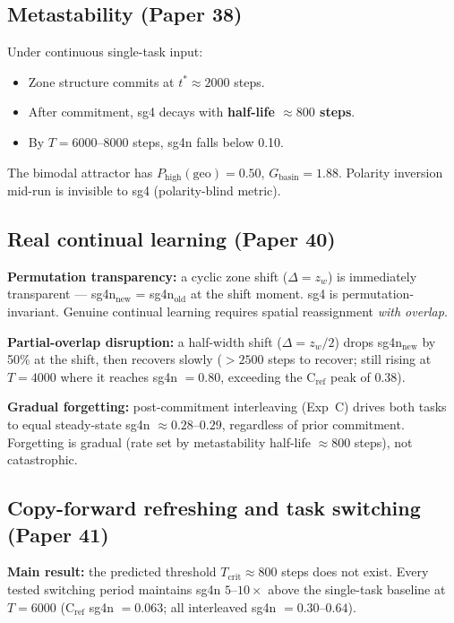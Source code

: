 \documentclass[11pt]{article}
\begin{document}
\subsection{Metastability (Paper 38)}

Under continuous single-task input:
\begin{itemize}[itemsep=2pt]
  \item Zone structure commits at $t^* \approx 2000$ steps.
  \item After commitment, sg4 decays with \textbf{half-life $\approx 800$ steps}.
  \item By $T = 6000$--$8000$ steps, sg4n falls below 0.10.
\end{itemize}
The bimodal attractor has $P_\mathrm{high}(\mathrm{geo}) = 0.50$, $G_\mathrm{basin} = 1.88$.
Polarity inversion mid-run is invisible to sg4 (polarity-blind metric).

\subsection{Real continual learning (Paper 40)}

\textbf{Permutation transparency:} a cyclic zone shift ($\Delta = z_w$) is immediately
transparent --- sg4n$_\mathrm{new}$ = sg4n$_\mathrm{old}$ at the shift moment.
sg4 is permutation-invariant.
Genuine continual learning requires spatial reassignment \emph{with overlap}.

\textbf{Partial-overlap disruption:} a half-width shift ($\Delta = z_w/2$) drops sg4n$_\mathrm{new}$
by 50\% at the shift, then recovers slowly ($> 2500$ steps to recover; still rising at $T=4000$
where it reaches sg4n $= 0.80$, exceeding the C$_\mathrm{ref}$ peak of $0.38$).

\textbf{Gradual forgetting:} post-commitment interleaving (Exp~C) drives both tasks to equal
steady-state sg4n $\approx 0.28$--$0.29$, regardless of prior commitment.
Forgetting is gradual (rate set by metastability half-life $\approx 800$ steps),
not catastrophic.

\subsection{Copy-forward refreshing and task switching (Paper 41)}

\textbf{Main result:} the predicted threshold $T_\mathrm{crit} \approx 800$ steps does not exist.
Every tested switching period maintains sg4n $5$--$10\times$ above the single-task baseline
at $T = 6000$ (C$_\mathrm{ref}$ sg4n $= 0.063$; all interleaved sg4n $= 0.30$--$0.64$).
\end{document}

